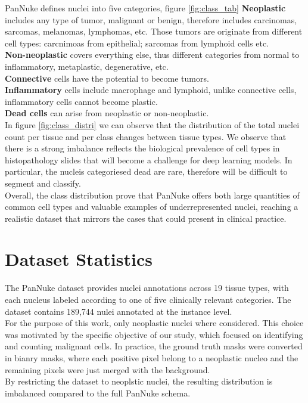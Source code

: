 \documentclass[target=bach,aauheader=,style=]{thud}
\begin{document}
PanNuke defines nuclei into five categories, figure \ref{fig:class_tab} \textbf{Neoplastic} includes any type of tumor, malignant or benign, therefore includes carcinomas, sarcomas, melanomas, lymphomas, etc. Those tumors are originate from different cell types: carcnimoas from epithelial; sarcomas from lymphoid cells etc.\\
\textbf{Non-neoplastic} covers everything else, thus different categories from normal to inflammatory, metaplastic, degenerative, etc.\\
\textbf{Connective} cells have the potential to become tumors.\\
\textbf{Inflammatory} cells include macrophage and lymphoid, unlike connective cells, inflammatory cells cannot become plastic.\\
\textbf{Dead cells} can arise from neoplastic or non-neoplastic.\\

In figure \ref{fig:class_distri} we can observe that the distribution of the total nuclei count per tissue and per class changes between tissue types. We observe that there is a strong imbalance reflects the biological prevalence of cell types in histopathology slides that will become a challenge for deep learning models. In particular, the nucleis categoriesed dead are rare, therefore will be difficult to segment and classify.\\
Overall, the class distribution prove that PanNuke offers both large quantities of common cell types and valuable examples of underrepresented nuclei, reaching a realistic dataset that mirrors the cases that could present in clinical practice.

\section{Dataset Statistics}
The PanNuke dataset provides nuclei annotations across 19 tissue types, with each nucleus labeled according to one of five clinically relevant categories. The dataset contains 189,744 nulei annotated at the instance level.\\
For the purpose of this work, only neoplastic nuclei where considered. This choice was motivated by the specific objective of our study, which focused on identifying and counting malignant cells. In practice, the ground truth masks were converted in bianry masks, where each positive pixel belong to a neoplastic nucleo and the remaining pixels were just merged with the background.\\
By restricting the dataset to neoplstic nuclei, the resulting distribution is imbalanced compared to the full PanNuke schema.
\end{document}
